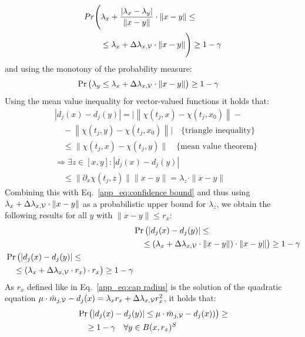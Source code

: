 \begin{align}
    &Pr\Bigg(\lambda_x + \frac{|\lambda_x - \lambda_y|}{\|x-y\|}\cdot \|x-y\| \le \\
    &\qquad\le \lambda_x + \Delta\lambda_{x,\mathcal{V}}\cdot \|x-y\|\Bigg)\ge 1-\gamma
\end{align}
and using the monotony of the probability measure:
\begin{align}
    \Pr\big(\lambda_y &\le \lambda_x + \Delta\lambda_{x,\mathcal{V}}\cdot \|x-y\|\big) \ge 1-\gamma\label{app_eq:confidence bound}
\end{align}
Using the mean value inequality for vector-valued functions it holds that:
\begin{align*}
    & |d_j(x) - d_j(y)|= | \left\lVert \chi(t_j,x) - \chi(t_j,x_0)\right\rVert -\\ &\quad- \left\lVert \chi(t_j,y) - \chi(t_j,x_0)\right\rVert|\quad \textrm{\{triangle inequality\}}\\
    &\quad \le \|\chi(t_j,x) - \chi(t_j,y)\|\quad \textrm{\{mean value theorem\}}\\
    &\Rightarrow\exists z\in [x,y] \colon  |d_j(x) - d_j(y)|\\ &\quad\le \|\partial_x \chi(t_j,z) \| \|x-y\| = \lambda_z \cdot \|x-y\|
\end{align*}
Combining this with Eq.~\eqref{app_eq:confidence bound} and thus using $\lambda_x + \Delta\lambda_{x,\mathcal{V}}\cdot \|x-y\|$ as a probabilistic upper bound for $\lambda_z$, we obtain the following results for all $y$ with $\|x-y\| \le r_x$:
\begin{align}
    &\Pr\big(|d_j(x)-d_j(y)|\le\nonumber\\
    &\quad\le (\lambda_x + \Delta\lambda_{x,\mathcal{V}}\cdot \|x-y\|) \cdot \|x-y\|\big) \ge 1-\gamma \nonumber\\
    \begin{split}
    &\Pr\big(|d_j(x)-d_j(y)|\le\\
    &\quad\le (\lambda_x + \Delta\lambda_{x,\mathcal{V}}\cdot r_x) \cdot r_x\big) \ge 1-\gamma
    \end{split}
\end{align}
As $r_x$ defined like in Eq.~\eqref{app_eq:cap radius} is the solution of the quadratic equation $\mu\cdot\bar{m}_{j,\mathcal{V}}-d_j(x)=\lambda_x r_x + \Delta\lambda_{x,\mathcal{V}} r_x^2$, it holds that:
\begin{align}
\begin{split}
    &\Pr\big(|d_j(x) - d_j(y)| \le \mu\cdot\bar{m}_{j,\mathcal{V}}-d_j(x))\big) \ge\\
    &\quad \ge 1-\gamma \quad\forall y\in B(x, r_x)^S\label{app_eq:probabilistic lipschitz}
\end{split}
\end{align}

